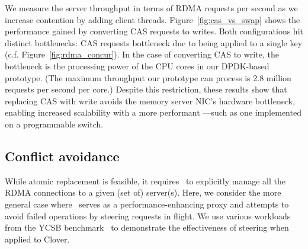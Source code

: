 We measure the server throughput in terms of RDMA requests per second as we
increase contention by adding client threads.  Figure~\ref{fig:cas_vs_swap}
shows the performance gained by converting CAS requests to writes. Both
configurations hit distinct bottlenecks: CAS requests bottleneck due to being
applied to a single key (c.f. Figure~\ref{fig:rdma_concur}). In the case of
converting CAS to write, the bottleneck is the processing power of the CPU cores
in our DPDK-based {\sword} prototype. (The maximum throughput our prototype can
process is 2.8 million requests per second per core.)
Despite this restriction, these results show that replacing CAS with write
avoids the memory server NIC's hardware bottleneck, enabling increased
scalability with a more performant {\sword}---such as one implemented on a
programmable switch. ~



\subsection{Conflict avoidance}

While atomic replacement is feasible, it requires \sword\ to
explicitly manage all the RDMA connections to a given (set of)
server(s).  Here, we consider the more general case where
\sword\ serves as a performance-enhancing proxy and attempts to avoid
failed operations by steering requests in flight.  We use various
workloads from the YCSB benchmark~\cite{ycsb} to demonstrate the
effectiveness of steering when applied to Clover.

